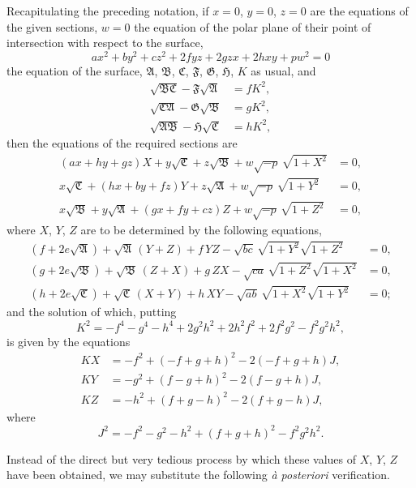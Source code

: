 \documentclass[11pt]{article}
\begin{document}
Recapitulating the preceding notation, if $x=0$, $y=0$, $z=0$ are the equations of the given sections, $w=0$ the equation of the polar plane of their point of intersection with respect to the surface,
\[
ax^2+by^2+cz^2+2fyz+2gzx+2hxy+pw^2=0
\]
the equation of the surface, $\mathfrak{A}$, $\mathfrak{B}$, $\mathfrak{C}$, $\mathfrak{F}$, $\mathfrak{G}$, $\mathfrak{H}$, $K$ as usual, and
\begin{align*}
\sqrt{\mathfrak{B}\mathfrak{C}}-\mathfrak{F}\sqrt{\mathfrak{A}} &= fK^2,\\
\sqrt{\mathfrak{C}\mathfrak{A}}-\mathfrak{G}\sqrt{\mathfrak{B}} &= gK^2,\\
\sqrt{\mathfrak{A}\mathfrak{B}}-\mathfrak{H}\sqrt{\mathfrak{C}} &= hK^2,
\end{align*}
then the equations of the required sections are
\begin{align*}
(ax+hy+gz)X + y\sqrt{\mathfrak{C}} + z\sqrt{\mathfrak{B}} + w\sqrt{-p}\,\sqrt{1+X^2} &= 0,\\
x\sqrt{\mathfrak{C}} + (hx+by+fz)Y + z\sqrt{\mathfrak{A}} + w\sqrt{-p}\,\sqrt{1+Y^2} &= 0,\\
x\sqrt{\mathfrak{B}} + y\sqrt{\mathfrak{A}} + (gx+fy+cz)Z + w\sqrt{-p}\,\sqrt{1+Z^2} &= 0,
\end{align*}
where $X$, $Y$, $Z$ are to be determined by the following equations,
\begin{align*}
(f+2e\sqrt{\mathfrak{A}}) + \sqrt{\mathfrak{A}}\,(Y+Z) + f\,YZ - \sqrt{bc}\,\sqrt{1+Y^2}\sqrt{1+Z^2} &= 0,\\
(g+2e\sqrt{\mathfrak{B}}) + \sqrt{\mathfrak{B}}\,(Z+X) + g\,ZX - \sqrt{ca}\,\sqrt{1+Z^2}\sqrt{1+X^2} &= 0,\\
(h+2e\sqrt{\mathfrak{C}}) + \sqrt{\mathfrak{C}}\,(X+Y) + h\,XY - \sqrt{ab}\,\sqrt{1+X^2}\sqrt{1+Y^2} &= 0;
\end{align*}
and the solution of which, putting
\[
K^2 = -f^4-g^4-h^4+2g^2h^2+2h^2f^2+2f^2g^2-f^2g^2h^2,
\]
is given by the equations
\begin{align*}
KX &= -f^2 + (-f+g+h)^2 - 2(-f+g+h)J,\\
KY &= -g^2 + (f-g+h)^2 - 2(f-g+h)J,\\
KZ &= -h^2 + (f+g-h)^2 - 2(f+g-h)J,
\end{align*}
where
\[
J^2 = -f^2-g^2-h^2+(f+g+h)^2-f^2g^2h^2.
\]

Instead of the direct but very tedious process by which these values of $X$, $Y$, $Z$ have been obtained, we may substitute the following \textit{\`a posteriori} verification.
\end{document}
